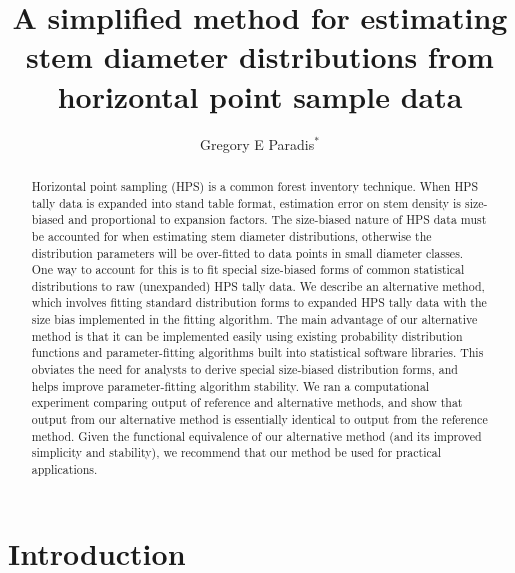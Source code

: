 \documentclass{foresj}
\begin{document}
\title{A simplified method for estimating stem diameter distributions from horizontal point sample data}

\author[Paradis, GE]{Gregory E Paradis$^{\ast}$}
\date{}

\begin{abstract}
Horizontal point sampling (HPS) is a common forest inventory technique. 
When HPS tally data is expanded into stand table format, estimation error on stem density is size-biased and proportional to expansion factors. 
The size-biased nature of HPS data must be accounted for when estimating stem diameter distributions, otherwise the distribution parameters will be over-fitted to data points in small diameter classes. 
One way to account for this is to fit special size-biased forms of common statistical distributions to raw (unexpanded) HPS tally data. 
We describe an alternative method, which involves fitting standard distribution forms to expanded HPS tally data with the size bias implemented in the fitting algorithm. 
The main advantage of our alternative method is that it can be
implemented easily using existing probability distribution functions
and parameter-fitting algorithms built
into statistical software libraries.
This obviates the need for analysts to derive special size-biased
distribution forms, and helps improve parameter-fitting algorithm stability. 
We ran a computational experiment comparing output of reference and
alternative methods, and show that output from our alternative method
is essentially identical to output from the reference method. 
Given the functional equivalence of our alternative method (and its
improved simplicity and stability), we recommend that our method be
used for practical applications.
\end{abstract}

\maketitle


\section{Introduction}
\label{sec:introduction}
\end{document}
